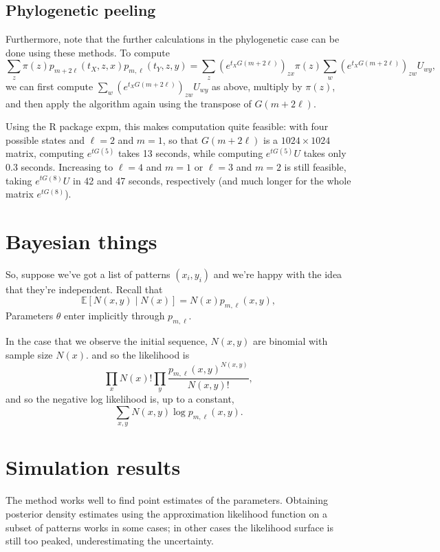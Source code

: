 \documentclass{article}
\newcommand{\E}{\mathbb{E}}
\theoremstyle{plain}
\theoremstyle{definition}
\begin{document}
\subsection{Phylogenetic peeling}

Furthermore, note that the further calculations in the phylogenetic case can be done using these methods.
To compute
\[
    \sum_z \pi(z) p_{m+2\ell}(t_X,z,x) p_{m,\ell}(t_Y,z,y) 
    = \sum_z \left( e^{t_X G(m+2\ell)} \right)_{zx} \pi(z) \sum_w \left( e^{t_X G(m+2\ell)} \right)_{zw} U_{wy} ,
\]
we can first compute $\sum_w \left( e^{t_X G(m+2\ell)} \right)_{zw} U_{wy}$ as above,
multiply by $\pi(z)$, and then apply the algorithm again using the transpose of $G(m+2\ell)$.

Using the R package expm, this makes computation quite feasible:
with four possible states and $\ell=2$ and $m=1$, so that $G(m+2\ell)$ is a $1024 \times 1024$ matrix,
computing $e^{t G(5) }$ takes 13 seconds, while computing $e^{t G(5)} U$ takes only 0.3 seconds.
Increasing to $\ell=4$ and $m=1$ or $\ell=3$ and $m=2$ is still feasible, taking $e^{t G(8)} U$ in 42 and 47 seconds, respectively
(and much longer for the whole matrix $e^{t G(8)}$).



\section{Bayesian things}

So, suppose we've got a list of patterns $(x_i,y_i)$
and we're happy with the idea that they're independent.
Recall that
\[
\E\left[ N(x,y) \mid N(x) \right] = N(x) p_{m,\ell}(x,y) ,
\]
Parameters $\theta$ enter implicitly through $p_{m,\ell}$.


In the case that we observe the initial sequence, $N(x,y)$ are binomial with sample size $N(x)$.
and so the likelihood is 
\[
\prod_x N(x)! \prod_y \frac{ p_{m,\ell}(x,y)^{N(x,y)} }{ N(x,y)! } ,
\]
and so the negative log likelihood is, up to a constant,
\[
\sum_{x,y} N(x,y) \log p_{m,\ell}(x,y) .
\]

\section{Simulation results}

The method works well to find point estimates of the parameters.
Obtaining posterior density estimates using the approximation likelihood function on a subset of patterns
works in some cases;
in other cases the likelihood surface is still too peaked, underestimating the uncertainty.
\end{document}
